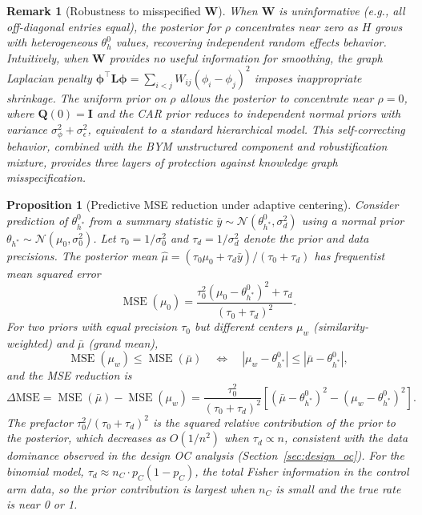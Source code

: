 \documentclass[12pt]{article}
\newtheorem{proposition}{Proposition}
\newtheorem{remark}{Remark}
\newcommand{\bphi}{\boldsymbol{\phi}}
\newcommand{\bW}{\mathbf{W}}
\newcommand{\bL}{\mathbf{L}}
\newcommand{\bI}{\mathbf{I}}
\newcommand{\bQ}{\mathbf{Q}}
\begin{document}
\begin{remark}[Robustness to misspecified $\bW$]
\label{rem:robustness}
When $\bW$ is uninformative (e.g., all off-diagonal entries equal), the posterior for $\rho$ concentrates near zero as $H$ grows with heterogeneous $\theta_h^0$ values, recovering independent random effects behavior. Intuitively, when $\bW$ provides no useful information for smoothing, the graph Laplacian penalty $\bphi^\top \bL \bphi = \sum_{i<j} W_{ij}(\phi_i - \phi_j)^2$ imposes inappropriate shrinkage. The uniform prior on $\rho$ allows the posterior to concentrate near $\rho = 0$, where $\bQ(0) = \bI$ and the CAR prior reduces to independent normal priors with variance $\sigma_\phi^2 + \sigma_\epsilon^2$, equivalent to a standard hierarchical model. This self-correcting behavior, combined with the BYM unstructured component and robustification mixture, provides three layers of protection against knowledge graph misspecification.
\end{remark}

\begin{proposition}[Predictive MSE reduction under adaptive centering]
\label{prop:mse_reduction}
Consider prediction of $\theta_{h^*}^0$ from a summary statistic $\bar{y} \sim \mathcal{N}(\theta_{h^*}^0, \sigma_d^2)$ using a normal prior $\theta_{h^*} \sim \mathcal{N}(\mu_0, \sigma_0^2)$. Let $\tau_0 = 1/\sigma_0^2$ and $\tau_d = 1/\sigma_d^2$ denote the prior and data precisions. The posterior mean $\hat{\mu} = (\tau_0 \mu_0 + \tau_d \bar{y}) / (\tau_0 + \tau_d)$ has frequentist mean squared error
\begin{equation}
\label{eq:mse_decomposition}
\operatorname{MSE}(\mu_0) = \frac{\tau_0^2(\mu_0 - \theta_{h^*}^0)^2 + \tau_d}{(\tau_0 + \tau_d)^2}.
\end{equation}
For two priors with equal precision $\tau_0$ but different centers $\mu_w$ (similarity-weighted) and $\bar{\mu}$ (grand mean),
\begin{equation}
\label{eq:mse_comparison}
\operatorname{MSE}(\mu_w) \leq \operatorname{MSE}(\bar{\mu}) \quad \iff \quad |\mu_w - \theta_{h^*}^0| \leq |\bar{\mu} - \theta_{h^*}^0|,
\end{equation}
and the MSE reduction is
\begin{equation}
\label{eq:delta_mse}
\Delta\text{MSE} = \operatorname{MSE}(\bar{\mu}) - \operatorname{MSE}(\mu_w) = \frac{\tau_0^2}{(\tau_0 + \tau_d)^2} \left[(\bar{\mu} - \theta_{h^*}^0)^2 - (\mu_w - \theta_{h^*}^0)^2\right].
\end{equation}
The prefactor $\tau_0^2 / (\tau_0 + \tau_d)^2$ is the squared relative contribution of the prior to the posterior, which decreases as $O(1/n^2)$ when $\tau_d \propto n$, consistent with the data dominance observed in the design OC analysis (Section~\ref{sec:design_oc}). For the binomial model, $\tau_d \approx n_C \cdot p_C(1-p_C)$, the total Fisher information in the control arm data, so the prior contribution is largest when $n_C$ is small and the true rate is near 0 or 1.
\end{proposition}
\end{document}
